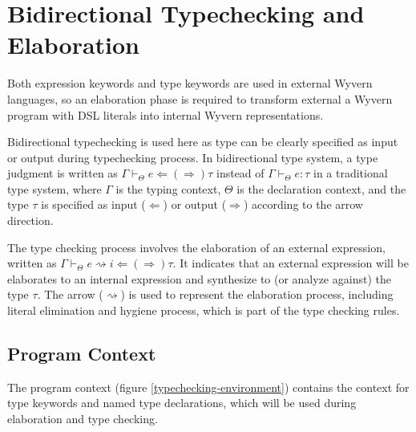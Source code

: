 \documentclass{sig-alternate}
\begin{document}
\section{Bidirectional Typechecking and Elaboration}
Both expression keywords and type keywords are used in external Wyvern languages, so an elaboration phase is required to transform external a Wyvern program with DSL literals into internal Wyvern representations.

Bidirectional typechecking is used here as type can be clearly specified as input or output during typechecking process. In bidirectional type system, a type judgment is written as $\Gamma\vdash_{\Theta} e\Leftarrow(\Rightarrow)\tau$ instead of $\Gamma\vdash_{\Theta} e:\tau$ in a traditional type system, where $\Gamma$ is the typing context, $\Theta$ is the declaration context, and the type $\tau$ is specified as input ($\Leftarrow$) or output ($\Rightarrow$) according to the arrow direction. 

The type checking process involves the elaboration of an external expression, written as $\Gamma\vdash_{\Theta} e\rightsquigarrow i \Leftarrow(\Rightarrow) \tau$. It indicates that an external expression will be elaborates to an internal expression and synthesize to (or analyze against) the type $\tau$. The arrow ($\rightsquigarrow$) is used to represent the elaboration process, including literal elimination and hygiene process, which is part of the type checking rules.

\subsection{Program Context}
The program context (figure \ref{typechecking-environment}) contains the context for type keywords and named type declarations, which will be used during elaboration and type checking. 
\end{document}
